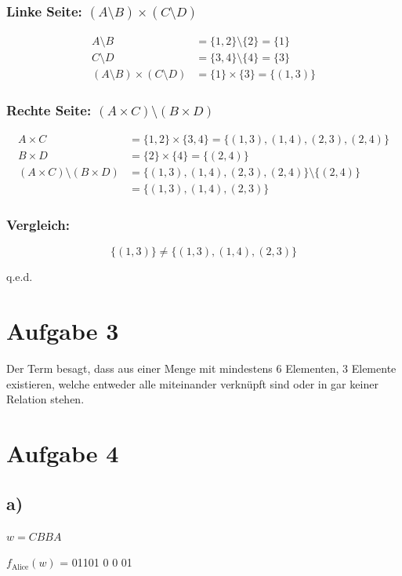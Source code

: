 \documentclass{article}
\begin{document}
\subsubsection*{Linke Seite: $(A \setminus B) \times (C \setminus D)$}
\begin{align*}
A \setminus B &= \{1, 2\} \setminus \{2\} = \{1\} \\
C \setminus D &= \{3, 4\} \setminus \{4\} = \{3\} \\
(A \setminus B) \times (C \setminus D) &= \{1\} \times \{3\} = \{(1, 3)\}
\end{align*}

\subsubsection*{Rechte Seite: $(A \times C) \setminus (B \times D)$}
\begin{align*}
A \times C &= \{1, 2\} \times \{3, 4\} = \{(1, 3), (1, 4), (2, 3), (2, 4)\} \\
B \times D &= \{2\} \times \{4\} = \{(2, 4)\} \\
(A \times C) \setminus (B \times D) &= \{(1, 3), (1, 4), (2, 3), (2, 4)\} \setminus \{(2, 4)\} \\
&= \{(1, 3), (1, 4), (2, 3)\}
\end{align*}

\subsubsection*{Vergleich:}
$$\{(1, 3)\} \neq \{(1, 3), (1, 4), (2, 3)\}$$

q.e.d.

\section*{Aufgabe 3}
Der Term besagt, dass aus einer Menge mit mindestens 6 Elementen, 3 Elemente existieren, welche entweder alle miteinander verknüpft sind oder in gar keiner Relation stehen.


\section*{Aufgabe 4}
\subsection*{a)}

$w = CBBA$

$f_{\text{Alice}}(w)$ = 01101 0 0 01
\end{document}
